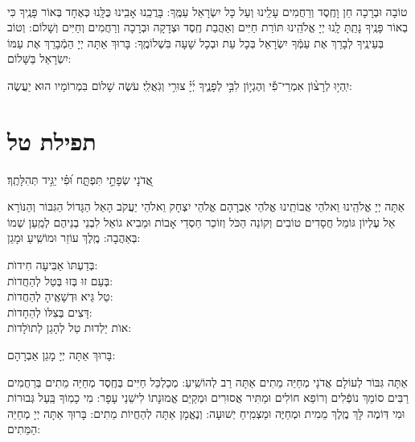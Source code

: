 \documentclass[twoside, openany, parskip=half, 11pt]{book}
\begin{document}
\shatz\\
 טוֹבָה וּבְרָכָה חֵן וָחֶֽסֶד וְרַחֲמִים עָלֵֽינוּ וְעַל כָּל יִשְׂרָאֵל עַמֶּֽךָ: בָּרֲכֵֽנוּ אָבִֽינוּ כֻּלָּֽנוּ כְּאֶחָד בְּאוֹר פָּנֶֽיךָ כִּי בְאוֹר פָּנֶֽיךָ נָתַֽתָּ לָֽנוּ יְיָ אֱלֹהֵֽינוּ תּוֹרַת חַיִּים וְאַהֲבַת חֶֽסֶד וּצְדָקָה וּבְרָכָה וְרַחֲמִים וְחַיִּים וְשָׁלוֹם: וְטוֹב בְּעֵינֶֽיךָ לְבָרֵךְ אֶת עַמְּֿךָ יִשְׂרָאֵל בְּכָל עֵת וּבְכָל שָׁעָה בִּשְׁלוֹמֶֽךָ: בָּרוּךְ אַתָּה יְיָ הַמְֿבָרֵךְ אֶת עַמּוֹ יִשְׂרָאֵל בַּשָּׁלוֹם:

 יִֽהְי֥וּ לְרָצ֨וֹן אִמְרֵי־פִ֡י וְהֶגְי֣וֹן לִבִּ֣י לְפָנֶ֑יךָ יְ֜יָ֗ צוּרִ֥י וְגֹֽאֲלִֽי׃ עֹשֶׂה שָׁלוֹם בִּמְרוֹמָיו הוּא יַעֲשֶׂה:

 \vfill 
 

 \sepline
 
 \clearpage

\section[תפילת טל]{ תפילת טל }
\label{tefilastal}


 \begin{small}
אֲ֭דֹנָי שְׂפָתַ֣י תִּפְתָּ֑ח וּ֝פִ֗י יַגִּ֥יד תְּהִלָּתֶֽךָ׃
\\
\end{small} 
 אַתָּה יְיָ אֱלֹהֵֽינוּ וֵאלֹהֵי אֲבוֹתֵֽינוּ אֱלֹהֵי אַבְרָהָם אֱלֹהֵי יִצְחָק וֵאלֹהֵי יַעֲקֹב הָאֵל הַגָּדוֹל הַגִּבּוֹר וְהַנּוֹרָא אֵל עֶלְיוֹן גּוֹמֵל חֲסָדִים טוֹבִים וְקוֹנֵה הַכֹּל וְזוֹכֵר חַסְדֵי אָבוֹת וּמֵבִיא גוֹאֵל לִבְנֵי בְנֵיהֶם לְמַֽעַן שְׁמוֹ בְּאַהֲבָה: מֶֽלֶךְ עוֹזֵר וּמוֹשִֽׁיעַ וּמָגֵן:


\begin{large}
 בְּדַעְתּוׂ אַבִּיעָה חִידוׂת: \\
בְּעַם זוּ בְּזוּ בְּטַל לְהַחֲדוׂת:\\
טַל גֵּיא וּדְשָׁאֶֽיהָ לְהַחֲדוׂת: \\
דָּצִים בְּצִלּוׂ לְהֵחָדוׂת:\\
אוׂת יַלְדוּת טַל לְהָגֵן לְתוׂלָדוׂת:

\end{large}


בָּרוּךְ אַתָּה יְיָ מָגֵן אַבְרָהָם:

אַתָּה גִּבּוֹר לְעוֹלָם אֲדֹנָי מְחַיֵּה מֵתִים אַתָּה רַב לְהוֹשִֽׁיעַ: מְכַלְכֵּל חַיִּים בְּחֶֽסֶד מְחַיֵּה מֵתִים בְּרַחֲמִים רַבִּים סוֹמֵךְ נוֹפְֿלִים וְרוֹפֵא חוֹלִים וּמַתִּיר אֲסוּרִים וּמְקַיֵּם אֱמוּנָתוֹ לִישֵׁנֵי עָפָר: מִי כָמֽוֹךָ בַּֽעַל גְּבוּרוֹת וּמִי דּֽוֹמֶה לָּךְ מֶֽלֶךְ מֵמִית וּמְחַיֶּה וּמַצְמִֽיחַ יְשׁוּעָה: וְנֶאֱמָן אַתָּה לְהַחֲיוֹת מֵתִים: בָּרוּךְ אַתָּה יְיָ מְחַיֵּה הַמֵּתִים:
\end{document}
